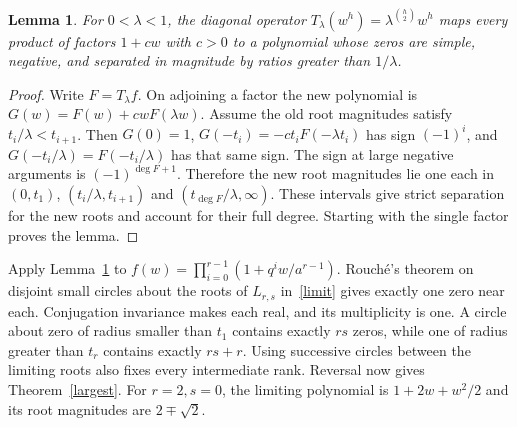 \documentclass[11pt]{article}
\newtheorem{lemma}[theorem]{Lemma}
\begin{document}
\begin{lemma}\label{sep}
For $0<\lambda<1$, the diagonal operator $T_\lambda(w^h)=\lambda^{\binom h2}w^h$ maps every product of factors $1+cw$ with $c>0$ to a polynomial whose zeros are simple, negative, and separated in magnitude by ratios greater than $1/\lambda$.
\end{lemma}
\begin{proof}
Write $F=T_\lambda f$. On adjoining a factor the new polynomial is $G(w)=F(w)+cwF(\lambda w)$. Assume the old root magnitudes satisfy $t_i/\lambda<t_{i+1}$. Then $G(0)=1$, $G(-t_i)=-ct_iF(-\lambda t_i)$ has sign $(-1)^i$, and $G(-t_i/\lambda)=F(-t_i/\lambda)$ has that same sign. The sign at large negative arguments is $(-1)^{\deg F+1}$. Therefore the new root magnitudes lie one each in $(0,t_1)$, $(t_i/\lambda,t_{i+1})$ and $(t_{\deg F}/\lambda,\infty)$. These intervals give strict separation for the new roots and account for their full degree. Starting with the single factor proves the lemma.
\end{proof}

Apply Lemma~\ref{sep} to $f(w)=\prod_{i=0}^{r-1}(1+q^i w/a^{r-1})$. Rouch\'e's theorem on disjoint small circles about the roots of $L_{r,s}$ in~\eqref{limit} gives exactly one zero near each. Conjugation invariance makes each real, and its multiplicity is one. A circle about zero of radius smaller than $t_1$ contains exactly $rs$ zeros, while one of radius greater than $t_r$ contains exactly $rs+r$. Using successive circles between the limiting roots also fixes every intermediate rank. Reversal now gives Theorem~\ref{largest}. For $r=2,s=0$, the limiting polynomial is $1+2w+w^2/2$ and its root magnitudes are $2\mp\sqrt2$.
\end{document}
